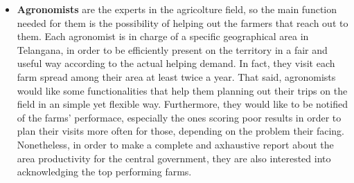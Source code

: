 \documentclass[table, 12pt]{article}
\begin{document}
\begin{itemize}
    \item \textbf{Agronomists} are the experts in the agricolture field, so the main function needed for them is the possibility of helping out the farmers that reach out to them. Each agronomist is in charge of a specific geographical area in Telangana, in order to be efficiently present on the territory in a fair and useful way according to the actual helping demand. In fact, they visit each farm spread among their area at least twice a year. That said, agronomists would like some functionalities that help them planning out their trips on the field in an simple yet flexible way. Furthermore, they would like to be notified of the farms' performace, especially the ones scoring poor results in order to plan their visits more often for those, depending on the problem their facing. Nonetheless, in order to make a complete and axhaustive report about the area productivity for the central government, they are also interested into acknowledging the top performing farms. %
\end{itemize}
\end{document}
